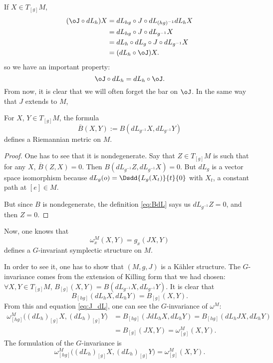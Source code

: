 \noindent If $X\in T_{[g]}M$,
\begin{equation}\nonumber
	\begin{split}
		(\oJ\circ dL_h)X&=dL_{hg}\circ J\circ dL_{(hg)^{-1}}dL_h X\\
		&=dL_{hg}\circ J\circ dL_{g^{-1}} X\\
		&=dL_h\circ dL_g\circ J\circ dL_{g^{-1}} X\\
		&=(dL_h\circ \oJ)X.
	\end{split}
\end{equation}
so we have an important property:
\begin{equation}\label{eq:J_dL}
	\oJ\circ dL_h=dL_h\circ\oJ.
\end{equation}
From now, it is clear that we will often forget the bar on $\oJ$.  In the same way that $J$ extends to $M$,

\begin{proposition}
	For $X$, $Y\in T_{[g]}M$, the formula
	\begin{equation}\label{eq:BdL}
		\overline{ B }(X,Y):=B(dL_{g^{-1}}X,dL_{g^{-1}}Y)
	\end{equation}
	defines a Riemannian metric on $M$.
\end{proposition}

\begin{proof}
	One has to see that it is nondegenerate. Say that $Z\in T_{[g]}M$ is such that for any $X$,
	$\overline{ B }(Z,X)=0$. Then $B(dL_{g^{-1}}Z,dL_{g^{-1}}X)=0$. But $dL_g$ is a vector space isomorphism because
	$dL_g(o)=\Dsdd{L_g(X_t)}{t}{0}$ with $X_t$, a constant path at $[e]\in M$.

	But since $B$ is nondegenerate, the definition \eqref{eq:BdL} says us $dL_{g^{-1}}Z=0$, and then $Z=0$.
\end{proof}

Now, one knows that
\begin{equation}
	\omega^M_x(X,Y)=g_x(JX,Y)
\end{equation}
defines a $G$-invariant symplectic structure on $M$.

In order to see it, one has to show that $(M,g,J)$ is  a Kähler structure. The $G$-invariance comes from the extension of Killing form that we had chosen: $\forall X,Y\in T_{[g]}M$, $B_{[g]}(X,Y)=B(dL_{g^{-1}}X,dL_{g^{-1}}Y)$.
It is clear that
\begin{equation}
	B_{[hg]}(dL_hX,dL_hY)=B_{[g]}(X,Y).
\end{equation}
From this and equation \eqref{eq:J_dL}, one can see the $G$-invariance of $\omega^M$:
\begin{equation}
	\begin{split}
		\omega^M_{[hg]}\big((dL_h)_{[g]}X, (dL_h)_{[g]}Y\big)&=B_{[hg]}(JdL_hX,dL_hY)
		=B_{[hg]}(dL_h J X,dL_hY)\\
		&=B_{[g]}(JX,Y)
		=\omega^M_{[g]}(X,Y).
	\end{split}
\end{equation}
The formulation of the $G$-invariance is
\begin{equation}
	\omega^M_{[hg]}\Big( (dL_h)_{[g]}X, (dL_h)_{[g]}Y \Big)=\omega^M_{[g]}(X,Y).
\end{equation}

